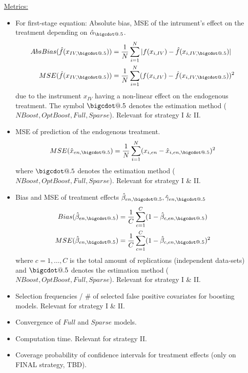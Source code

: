 \documentclass[12pt]{article}
\makeatletter
\newcommand*\bigcdot{\mathpalette\bigcdot@{.5}}
\newcommand*\bigcdot@[2]{\mathbin{\vcenter{\hbox{\scalebox{#2}{$\m@th#1\bullet$}}}}}
\makeatother
\begin{document}
\underline{Metrics:}
\begin{itemize}
\item{For first-stage equation: Absolute bias, MSE of the intrument’s effect on the treatment depending on $\hat{\alpha}_{\bigcdot}$.
\begin{align*}
AbsBias(\hat{f}(x_{IV, \bigcdot})) &= \frac{1}{N}\sum_{i=1}^N|f(x_{i,IV})-\hat{f}(x_{i,IV, \bigcdot})|\\
MSE(\hat{f}(x_{IV,\bigcdot})) &= \frac{1}{N}\sum_{i=1}^N(f(x_{i,IV})-\hat{f}(x_{i,IV, \bigcdot}))^2
\end{align*}
due to the instrument $x_{IV}$ having a non-linear effect on the endogenous treatment. The symbol $\bigcdot$ denotes the estimation method ($NBoost, OptBoost, Full, Sparse$). Relevant for strategy I \& II.
}
\item{MSE of prediction of the endogenous treatment.
$$
MSE(\hat{x}_{en, \bigcdot}) = \frac{1}{N}\sum_{i=1}^N(x_{i,en}-\hat{x}_{i,en,\bigcdot})^2
$$
where $\bigcdot$ denotes the estimation method ($NBoost, OptBoost, Full, Sparse$). Relevant for strategy I \& II.
}
\item{Bias and MSE of treatment effects $\hat{\beta}_{en,\bigcdot}, \hat{\gamma}_{en,\bigcdot}$
\begin{align*}
Bias(\hat{\beta}_{en,\bigcdot}) &= \frac{1}{C}\sum_{c=1}^C(1-\hat{\beta}_{c,en,\bigcdot})\\
MSE(\hat{\beta}_{en, \bigcdot}) &= \frac{1}{C}\sum_{c=1}^C(1-\hat{\beta}_{c,en,\bigcdot})^2
\end{align*}
where $c=1,\dots,C$ is the total amount of  replications (independent data-sets) and $\bigcdot$ denotes the estimation method ($NBoost, OptBoost, Full, Sparse$). Relevant for strategy I \& II.
}
\item Selection frequencies / \# of selected false positive covariates for boosting models. Relevant for strategy I \& II.
\item Convergence of $Full$ and $Sparse$ models.
\item Computation time. Relevant for strategy II.
\item Coverage probability of confidence intervals for treatment effects (only on FINAL strategy, TBD).
\end{itemize}
\end{document}
